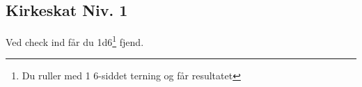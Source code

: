 \subsection{Kirkeskat Niv. 1}
Ved check ind får du 1d6\footnote{Du ruller med 1 6-siddet terning og får resultatet} fjend.